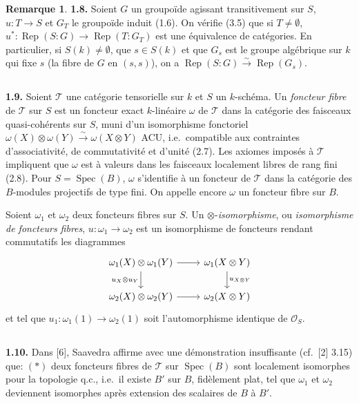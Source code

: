 \documentclass[12pt,a4paper]{article}
\theoremstyle{plain}
\theoremstyle{definition}
\newtheorem{remark}[theorem]{Remarque}
\theoremstyle{remark}
\DeclareMathOperator{\Spec}{Spec}
\DeclareMathOperator{\Rep}{Rep}
\begin{document}
\begin{remark}
\textbf{1.8.} Soient $G$ un groupoïde agissant transitivement sur $S$, $u : T \to S$ et $G_T$ le groupoïde induit (1.6). On vérifie (3.5) que si $T \neq \emptyset$, $u^* : \Rep(S:G) \to \Rep(T:G_T)$ est une équivalence de catégories. En particulier, si $S(k) \neq \emptyset$, que $s \in S(k)$ et que $G_s$ est le groupe algébrique sur $k$ qui fixe $s$ (la fibre de $G$ en $(s,s)$), on a $\Rep(S:G) \xrightarrow{\sim} \Rep(G_s)$.
\end{remark}

\subsection{}

\textbf{1.9.} Soient $\mathcal{T}$ une catégorie tensorielle sur $k$ et $S$ un $k$-schéma. Un \emph{foncteur fibre} de $\mathcal{T}$ sur $S$ est un foncteur exact $k$-linéaire $\omega$ de $\mathcal{T}$ dans la catégorie des faisceaux quasi-cohérents sur $S$, muni d'un isomorphisme fonctoriel $\omega(X) \otimes \omega(Y) \xrightarrow{\sim} \omega(X \otimes Y)$ ACU, i.e.~compatible aux contraintes d'associativité, de commutativité et d'unité (2.7). Les axiomes imposés à $\mathcal{T}$ impliquent que $\omega$ est à valeurs dans les faisceaux localement libres de rang fini (2.8). Pour $S = \Spec(B)$, $\omega$ s'identifie à un foncteur de $\mathcal{T}$ dans la catégorie des $B$-modules projectifs de type fini. On appelle encore $\omega$ un foncteur fibre sur $B$.

Soient $\omega_1$ et $\omega_2$ deux foncteurs fibres sur $S$. Un $\otimes$-\emph{isomorphisme}, ou \emph{isomorphisme de foncteurs fibres}, $u : \omega_1 \to \omega_2$ est un isomorphisme de foncteurs rendant commutatifs les diagrammes
\[
\begin{tikzcd}
\omega_1(X) \otimes \omega_1(Y) \arrow[r] \arrow[d, "u_X \otimes u_Y"'] & \omega_1(X \otimes Y) \arrow[d, "u_{X \otimes Y}"] \\
\omega_2(X) \otimes \omega_2(Y) \arrow[r] & \omega_2(X \otimes Y)
\end{tikzcd}
\]
et tel que $u_1 : \omega_1(1) \to \omega_2(1)$ soit l'automorphisme identique de $\mathcal{O}_S$.

\subsection{}

\textbf{1.10.} Dans [6], Saavedra affirme avec une démonstration insuffisante (cf.~[2] 3.15) que: $(*)$ deux foncteurs fibres de $\mathcal{T}$ sur $\Spec(B)$ sont localement isomorphes pour la topologie q.c., i.e.~il existe $B'$ sur $B$, fidèlement plat, tel que $\omega_1$ et $\omega_2$ deviennent isomorphes après extension des scalaires de $B$ à $B'$.
\end{document}
